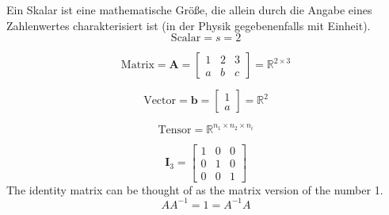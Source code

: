 \documentclass[../Main.tex]{subfiles}
\begin{document}
\begin{multicols}{2}
    Ein Skalar ist eine mathematische Größe,
    die allein durch die Angabe eines Zahlenwertes
    charakterisiert ist (in der Physik gegebenenfalls mit Einheit).
    \begin{equation}
        \text{Scalar} = s = 2
    \end{equation}

    \begin{equation}
        \text{Matrix} = \textbf{A} =
        \begin{bmatrix}
            1 & 2 & 3\\
            a & b & c
        \end{bmatrix} = \mathbb{R}^{2 \times 3}
    \end{equation}

    \begin{equation}
        \text{Vector} = \textbf{b} =
        \begin{bmatrix}
            1 \\
            a
        \end{bmatrix} = \mathbb{R}^2
    \end{equation}

    \begin{equation}
        \text{Tensor} = \mathbb{R}^{n_1 \times n_2 \times n_i}
    \end{equation}

    \begin{equation}
        \boldsymbol{I}_3 =
        \begin{bmatrix}
            1 & 0 & 0 \\
            0 & 1 & 0 \\
            0 & 0 & 1
        \end{bmatrix}
    \end{equation}
    The identity matrix can be thought of 
    as the matrix version of the number 1.
    \begin{equation}
        AA^{-1} = 1 = A^{-1}A
    \end{equation}
\end{multicols}
\end{document}
